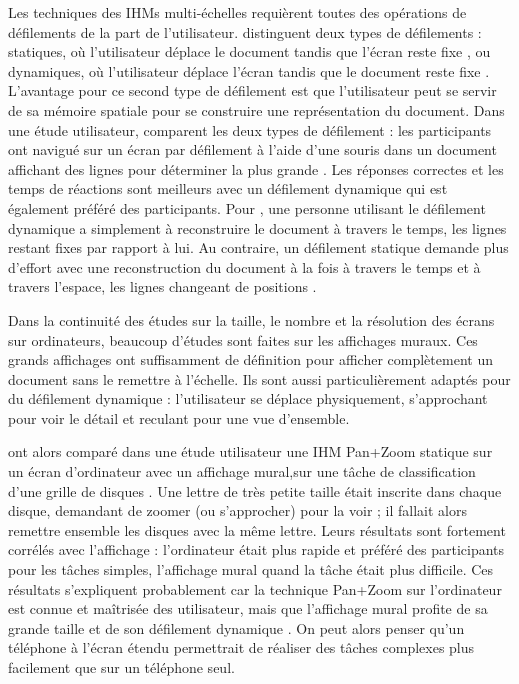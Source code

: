 Les techniques des IHMs multi-échelles requièrent toutes des opérations de défilements de la part de l'utilisateur. \cite{Mehra2006} distinguent deux types de défilements : statiques, où l'utilisateur déplace le document tandis que l'écran reste fixe , ou dynamiques, où l'utilisateur déplace l'écran tandis que le document reste fixe . L'avantage pour ce second type de défilement est que l'utilisateur peut se servir de sa mémoire spatiale pour se construire une représentation du document. Dans une étude utilisateur, \citeauthor{Mehra2006} comparent les deux types de défilement : les participants ont navigué sur un écran par défilement à l'aide d'une souris dans un document affichant des lignes pour déterminer la plus grande . Les réponses correctes et les temps de réactions sont meilleurs avec un défilement dynamique qui est également préféré des participants. Pour \citeauthor{Mehra2006}, une personne utilisant le défilement dynamique a simplement à reconstruire le document à travers le temps, les lignes restant fixes par rapport à lui. Au contraire, un défilement statique demande plus d'effort avec une reconstruction du document à la fois à travers le temps et à travers l'espace, les lignes changeant de positions .

Dans la continuité des études sur la taille, le nombre et la résolution des écrans sur ordinateurs, beaucoup d'études sont faites sur les affichages muraux. Ces grands affichages ont suffisamment de définition pour afficher complètement un document sans le remettre à l'échelle. Ils sont aussi particulièrement adaptés pour du défilement dynamique : l'utilisateur se déplace physiquement, s'approchant pour voir le détail et reculant pour une vue d'ensemble.


\cite{Liu2014} ont alors comparé dans une étude utilisateur une IHM Pan+Zoom statique sur un écran d'ordinateur avec un affichage mural,sur une tâche de classification d'une grille de disques . Une lettre de très petite taille était inscrite dans chaque disque, demandant de zoomer (ou s'approcher) pour la voir ; il fallait alors remettre ensemble les disques avec la même lettre. Leurs résultats sont fortement corrélés avec l'affichage : l'ordinateur était plus rapide et préféré des participants pour les tâches simples, l'affichage mural quand la tâche était plus difficile. Ces résultats s'expliquent probablement car la technique Pan+Zoom sur l'ordinateur est connue et maîtrisée des utilisateur, mais que l'affichage mural profite de sa grande taille \citep{Czerwinski2003} et de son défilement dynamique \citep{Mehra2006}. On peut alors penser qu'un téléphone à l'écran étendu permettrait de réaliser des tâches complexes plus facilement que sur un téléphone seul.

